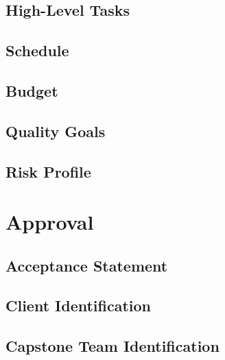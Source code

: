 \documentclass[10pt,letterpaper]{article}
\begin{document}
\subsection{High-Level Tasks}
\subsection{Schedule}
\subsection{Budget}
\subsection{Quality Goals}
\subsection{Risk Profile}

\section{Approval}
\subsection{Acceptance Statement}
\subsection{Client Identification}
\subsection{Capstone Team Identification}


\clearpage
{}



\end{document}
